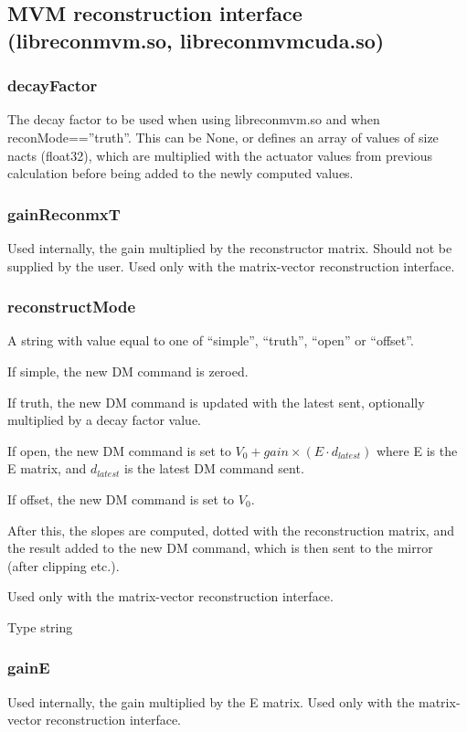 \documentclass[a4,10pt]{article}
\begin{document}
\subsection{MVM reconstruction interface (libreconmvm.so, libreconmvmcuda.so)}
\subsubsection{decayFactor}
The decay factor to be used when using libreconmvm.so and when
reconMode==''truth''.  This can be None, or defines an array of values
of size nacts (float32), which are multiplied with the actuator values from
previous calculation before being added to the newly computed values.

\subsubsection{gainReconmxT}
Used internally, the gain multiplied by the reconstructor matrix.
Should not be supplied by the user.  Used only with the matrix-vector
reconstruction interface.

\subsubsection{reconstructMode}
A string with value equal to one of ``simple'', ``truth'', ``open'' or
``offset''.  

If simple, the new DM command is zeroed.  

If truth, the new DM command is updated with the latest sent,
optionally multiplied by a decay factor value.

If open, the new DM command is set to $V_0 + gain \times (E \cdot
d_{latest})$ where E is the E matrix, and $d_{latest}$ is the latest DM
command sent.

If offset, the new DM command is set to $V_0$.

After this, the slopes are computed, dotted with the reconstruction
matrix, and the result added to the new DM command, which is then sent
to the mirror (after clipping etc.).

Used only with the matrix-vector
reconstruction interface.

Type string

\subsubsection{gainE}
Used internally, the gain multiplied by the E matrix.  Used only with the matrix-vector
reconstruction interface.
\end{document}
